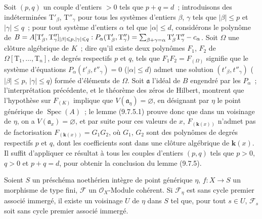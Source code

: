 
Soit $(p,q)$ un couple d'entiers $>0$ tels que $p+q=d$~; introduisons des
indéterminées $\mathrm T'_\beta$, $\mathrm T''_\gamma$ pour tous les systèmes
d'entiers $\beta$, $\gamma$ tels que $|\beta|\leqslant p$ et
$|\gamma|\leqslant q$~; pour tout système d'entiers $\alpha$ tel que
$|\alpha|\leqslant d$, considérons le polynôme de
$B=A[\mathrm T'_\beta,\mathrm T''_\gamma]_{|\beta|\leqslant p,
  |\gamma|\leqslant q}:
P_\alpha(\mathrm T'_\beta,\mathrm T''_\gamma)
=\sum_{\beta+\gamma=\alpha}\mathrm T'_\beta\mathrm T''_\gamma- c_\alpha$.
Soit $\Omega$ une clôture algébrique de $K$~; dire qu'il existe deux polynômes
$F_1$, $F_2$ de $\Omega[\mathrm T_1,\ldots,\mathrm T_n]$, de degrés respectifs
$p$ et $q$, tels que $F_1F_2=F_{(\Omega)}$ signifie que le système d'équations
$P_\alpha(t'_\beta,t''_\gamma)=0$ ($|\alpha|\leqslant d$) admet une solution
$(t'_\beta,t''_\gamma)$ ($|\beta|\leqslant p$, $|\gamma|\leqslant q$) formée
d'éléments de $\Omega$. Soit $\mathfrak a$ l'idéal de $B$ engendré par les
$P_\alpha$~; l'interprétation précédente, et le théorème des zéros de Hilbert,
montrent que l'hypothèse sur $F_{(K)}$ implique que
$V(\mathfrak a_\eta)=\varnothing$, en désignant par $\eta$ le point générique de
$\operatorname{Spec}(A)$~; le lemme (9.7.5.1) prouve donc que dans un voisinage
de $\eta$, on a $V(\mathfrak a_x)=\varnothing$, et par suite pour ces valeurs de $x$,
$F_{(\mathbf{k}(x))}$ n'admet pas de factorisation
$F_{(\mathbf{k}(x))}=G_1G_2$, où $G_1$, $G_2$ sont des polynômes de degrés
respectifs $p$ et $q$, dont les coefficients sont dans une clôture algébrique
de $\boldsymbol{k}(x)$. Il suffit d'appliquer ce résultat à tous les couples
d'entiers $(p,q)$ tels que $p>0$, $q>0$ et $p+q=d$, pour obtenir la conclusion
du lemme (9.7.5).

\begin{proposition}[9.7.6]
\label{IV.9.7.6-fr}
Soient $S$ un préschéma noethérien intègre de point générique $\eta$, $f:X\to S$
un morphisme de type fini, $\mathcal F$ un $\mathcal O_X$-Module cohérent. Si
$\mathcal F_\eta$ est sans cycle premier associé immergé, il existe un voisinage
$U$ de $\eta$ dans $S$ tel que, pour tout $s\in U$, $\mathcal F_s$ soit sans cycle
premier associé immergé.
\end{proposition}

